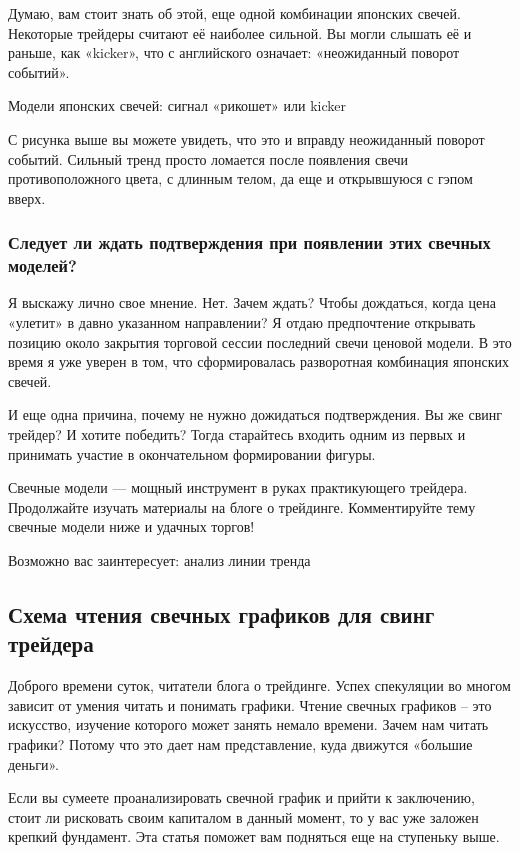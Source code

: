 \documentclass[a5paper]{article}
\begin{document}
Думаю, вам стоит знать об этой, еще одной комбинации японских свечей. Некоторые трейдеры считают её наиболее сильной. Вы могли слышать её и раньше, как «kicker», что с английского означает: «неожиданный поворот событий».

Модели японских свечей: сигнал «рикошет» или kicker

С рисунка выше вы можете увидеть, что это и вправду неожиданный
поворот событий. Сильный тренд просто ломается после появления свечи
противоположного цвета, с длинным телом, да еще и открывшуюся с гэпом
вверх.

\subsubsection{Следует ли ждать подтверждения при появлении этих свечных моделей?}

Я выскажу лично свое мнение. Нет. Зачем ждать? Чтобы дождаться, когда цена «улетит» в давно указанном направлении? Я отдаю предпочтение открывать позицию около закрытия торговой сессии последний свечи ценовой модели. В это время я уже уверен в том, что сформировалась разворотная комбинация японских свечей.

И еще одна причина, почему не нужно дожидаться подтверждения. Вы же свинг трейдер? И хотите победить? Тогда старайтесь входить одним из первых и принимать участие в окончательном формировании фигуры.

Свечные модели — мощный инструмент в руках практикующего трейдера. Продолжайте изучать материалы на блоге о трейдинге. Комментируйте тему свечные модели ниже и удачных торгов!

Возможно вас заинтересует: анализ линии тренда

\subsection{Схема чтения свечных графиков для свинг трейдера}

Доброго времени суток, читатели блога о трейдинге. Успех спекуляции во многом зависит от умения читать и понимать графики. Чтение свечных графиков – это искусство, изучение которого может занять немало времени. Зачем нам читать графики? Потому что это дает нам представление, куда движутся «большие деньги».

Если вы сумеете проанализировать свечной график и прийти к заключению, стоит ли рисковать своим капиталом в данный момент, то у вас уже заложен крепкий фундамент. Эта статья поможет вам подняться еще на ступеньку выше.
\end{document}
